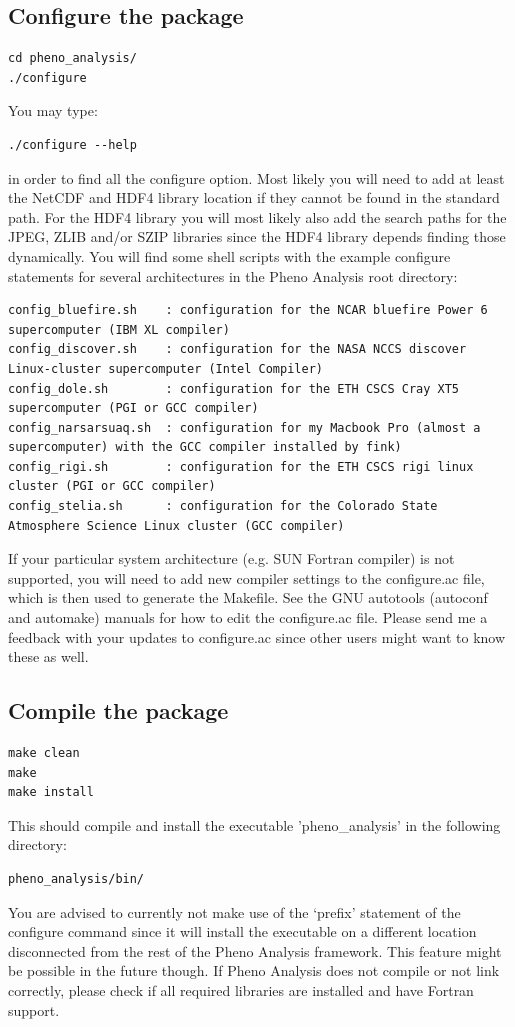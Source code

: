 \documentclass[a4paper,12pt]{article}
\begin{document}
\subsection{Configure the package}
\begin{verbatim}
cd pheno_analysis/
./configure
\end{verbatim}
You may type:
\begin{verbatim}
./configure --help
\end{verbatim}
in order to find all the configure option. Most likely you will need to add at least the NetCDF and HDF4 library location if they cannot be found in the standard path. For the HDF4 library you will most likely also add the search paths for the JPEG, ZLIB and/or SZIP libraries since the HDF4 library depends finding those dynamically. You will find some shell scripts with the example configure statements for several architectures in the Pheno Analysis root directory:
\begin{verbatim}
config_bluefire.sh    : configuration for the NCAR bluefire Power 6 supercomputer (IBM XL compiler)
config_discover.sh    : configuration for the NASA NCCS discover Linux-cluster supercomputer (Intel Compiler)
config_dole.sh        : configuration for the ETH CSCS Cray XT5 supercomputer (PGI or GCC compiler)
config_narsarsuaq.sh  : configuration for my Macbook Pro (almost a supercomputer) with the GCC compiler installed by fink)
config_rigi.sh        : configuration for the ETH CSCS rigi linux cluster (PGI or GCC compiler)
config_stelia.sh      : configuration for the Colorado State Atmosphere Science Linux cluster (GCC compiler)
\end{verbatim}
If your particular system architecture (e.g. SUN Fortran compiler) is not supported, you will need to add new compiler settings to the configure.ac file, which is then used to generate the Makefile. See the GNU autotools (autoconf and automake) manuals for how to edit the configure.ac file. Please send me a feedback with your updates to configure.ac since other users might want to know these as well.

\subsection{Compile the package}
\begin{verbatim}
make clean
make
make install
\end{verbatim}
This should compile and install the executable 'pheno\_analysis' in the following directory:
\begin{verbatim}
pheno_analysis/bin/
\end{verbatim}
You are advised to currently not make use of the `prefix' statement of the configure command since it will install the executable on a different location disconnected from the rest of the Pheno Analysis framework. This feature might be possible in the future though. If Pheno Analysis does not compile or not link correctly, please check if all required libraries are installed and have Fortran support.
\end{document}
